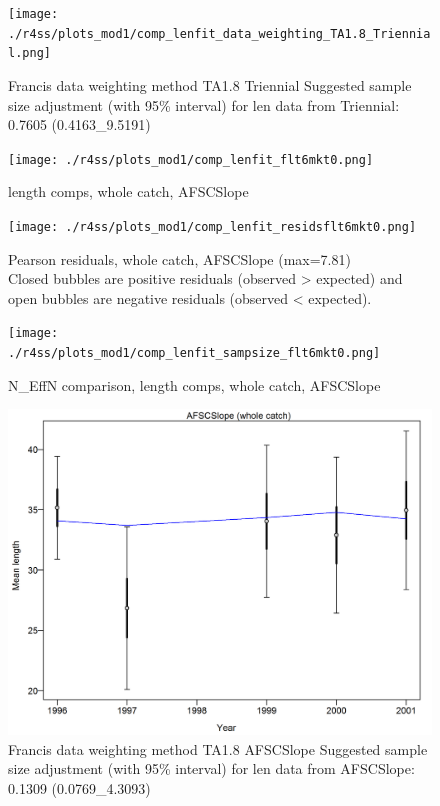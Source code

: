 \documentclass[12pt,]{article}
\begin{document}
\begin{figure}
\centering
\texttt{[image: ./r4ss/plots\_mod1/comp\_lenfit\_data\_weighting\_TA1.8\_Triennial.png]}
\caption{Francis data weighting method TA1.8 Triennial Suggested sample
size adjustment (with 95\% interval) for len data from Triennial: 0.7605
(0.4163\_9.5191)
\label{fig:mod1_21_comp_lenfit_data_weighting_TA1.8_Triennial}}
\end{figure}

\begin{figure}
\centering
\texttt{[image: ./r4ss/plots\_mod1/comp\_lenfit\_flt6mkt0.png]}
\caption{length comps, whole catch, AFSCSlope
\label{fig:mod1_22_comp_lenfit_flt6mkt0}}
\end{figure}

\begin{figure}
\centering
\texttt{[image: ./r4ss/plots\_mod1/comp\_lenfit\_residsflt6mkt0.png]}
\caption{Pearson residuals, whole catch, AFSCSlope (max=7.81)\\
Closed bubbles are positive residuals (observed \textgreater{} expected)
and open bubbles are negative residuals (observed \textless{} expected).
\label{fig:mod1_23_comp_lenfit_residsflt6mkt0}}
\end{figure}

\begin{figure}
\centering
\texttt{[image: ./r4ss/plots\_mod1/comp\_lenfit\_sampsize\_flt6mkt0.png]}
\caption{N\_EffN comparison, length comps, whole catch, AFSCSlope
\label{fig:mod1_24_comp_lenfit_sampsize_flt6mkt0}}
\end{figure}

\begin{figure}
\centering
\includegraphics{./r4ss/plots_mod1/comp_lenfit_data_weighting_TA1.8_AFSCSlope.png}
\caption{Francis data weighting method TA1.8 AFSCSlope Suggested sample
size adjustment (with 95\% interval) for len data from AFSCSlope: 0.1309
(0.0769\_4.3093)
\label{fig:mod1_25_comp_lenfit_data_weighting_TA1.8_AFSCSlope}}
\end{figure}
\end{document}
